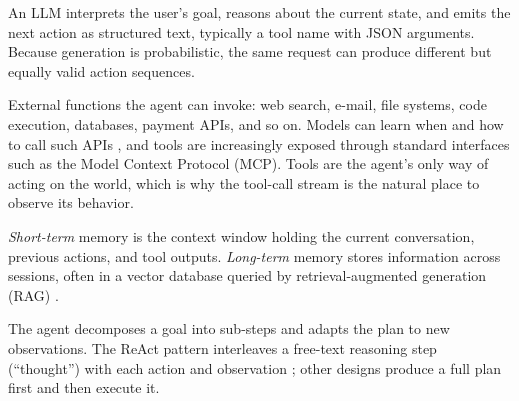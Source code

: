\documentclass[11pt,a4paper]{article}
\begin{document}
\begin{description}[leftmargin=0pt,itemsep=3pt]
  \item[Language model (the ``brain'').] An LLM interprets the user's goal, reasons about the current state, and emits the next action as structured text, typically a tool name with JSON arguments. Because generation is probabilistic, the same request can produce different but equally valid action sequences.
  \item[Tools.] External functions the agent can invoke: web search, e-mail, file systems, code execution, databases, payment APIs, and so on. Models can learn when and how to call such APIs \citep{schick2023toolformer}, and tools are increasingly exposed through standard interfaces such as the Model Context Protocol (MCP). Tools are the agent's only way of acting on the world, which is why the tool-call stream is the natural place to observe its behavior.
  \item[Memory.] \emph{Short-term} memory is the context window holding the current conversation, previous actions, and tool outputs. \emph{Long-term} memory stores information across sessions, often in a vector database queried by retrieval-augmented generation (RAG) \citep{weng2023agents}.
  \item[Planning.] The agent decomposes a goal into sub-steps and adapts the plan to new observations. The ReAct pattern interleaves a free-text reasoning step (``thought'') with each action and observation \citep{yao2023react}; other designs produce a full plan first and then execute it.
\end{description}
\end{document}
